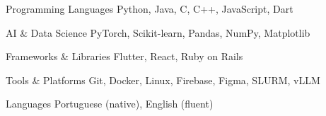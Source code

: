 
\begin{cvskills}

  \cvskill
    {Programming Languages} %
    {Python, Java, C, C++, JavaScript, Dart}

  \cvskill
    {AI \& Data Science} %
    {PyTorch, Scikit-learn, Pandas, NumPy, Matplotlib}

  \cvskill
    {Frameworks \& Libraries} %
    {Flutter, React, Ruby on Rails}

  \cvskill
    {Tools \& Platforms} %
    {Git, Docker, Linux, Firebase, Figma, SLURM, vLLM}

  \cvskill
    {Languages} %
    {Portuguese (native), English (fluent)}

\end{cvskills}